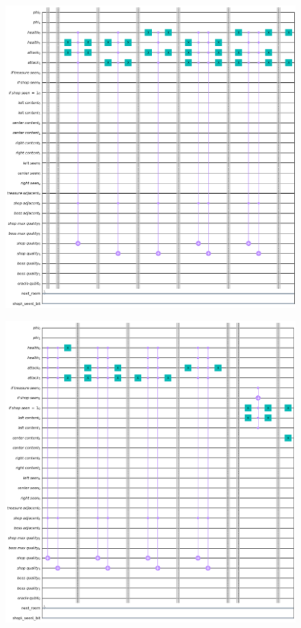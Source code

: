 \documentclass{book}
\theoremstyle{definition}
\theoremstyle{definition}
\theoremstyle{definition}
\theoremstyle{plain}
\theoremstyle{plain}
\theoremstyle{plain}
\theoremstyle{plain}
\begin{document}
\begin{figure}[H]
\begin{center}
    \includegraphics[width=16cm]{immagini_circuito_8_stanze/mega_circ_2.png}
\end{center}
\end{figure}

\begin{figure}[H]
\begin{center}
    \includegraphics[width=16cm]{immagini_circuito_8_stanze/mega_circ_3.png}
\end{center}
\end{figure}
\end{document}
